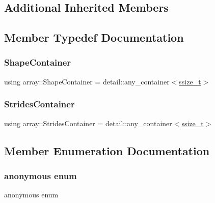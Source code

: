 \subsection*{Additional Inherited Members}


\subsection{Member Typedef Documentation}
\mbox{\label{classarray_a3378d7821106645fa3a88c5222e127e0}} 
\subsubsection{\texorpdfstring{ShapeContainer}{ShapeContainer}}
{\footnotesize\ttfamily using array\+::\+Shape\+Container =  detail\+::any\+\_\+container$<$\mbox{\hyperlink{detail_2common_8h_ac430d16fc097b3bf0a7469cfd09decda}{ssize\+\_\+t}}$>$}

\mbox{\label{classarray_a8ba4f30946f0bc69ec937160c9fb10e1}} 
\subsubsection{\texorpdfstring{StridesContainer}{StridesContainer}}
{\footnotesize\ttfamily using array\+::\+Strides\+Container =  detail\+::any\+\_\+container$<$\mbox{\hyperlink{detail_2common_8h_ac430d16fc097b3bf0a7469cfd09decda}{ssize\+\_\+t}}$>$}



\subsection{Member Enumeration Documentation}
\mbox{\label{classarray_af40deff69606a75cf645863432967ba7}} 
\subsubsection{\texorpdfstring{anonymous enum}{anonymous enum}}
{\footnotesize\ttfamily anonymous enum}

